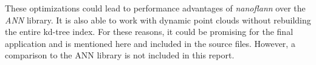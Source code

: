 These optimizations could lead to performance advantages of {\itshape nanoflann} over the {\itshape ANN} library. It is also able to work with dynamic point clouds without rebuilding the entire kd-tree index. For these reasons, it could be promising for the final application and is mentioned here and included in the source files. However, a comparison to the ANN library is not included in this report.